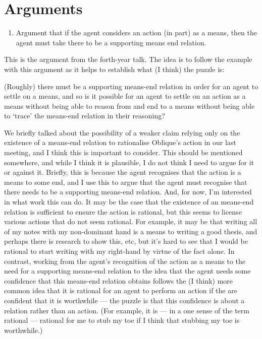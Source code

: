 \documentclass[10pt]{article}
\begin{document}
\section{Arguments}
\label{sec:arguments-1}

\begin{enumerate}
\item Argument that if the agent considers an action (in part) as a means, then the agent must take there to be a supporting means end relation.
\end{enumerate}

\begin{note}
  This is the argument from the forth-year talk.
  The idea is to follow the example with this argument as it helps to establish what (I think) the puzzle is:

  (Roughly) there must be a supporting means-end relation in order for an agent to settle on a means, and so is it possible for an agent to settle on an action as a means without being able to reason from and end to a means without being able to `trace' the means-end relation in their reasoning?

  We briefly talked about the possibility of a weaker claim relying only on the existence of a means-end relation to rationalise Oblique's action in our last meeting, and I think this is important to consider.
  This should be mentioned somewhere, and while I think it is plausible, I do not think I need to argue for it or against it.
  Briefly, this is because the agent recognises that the action is a means to some end, and I use this to argue that the agent must recognise that there needs to be a supporting means-end relation.
  And, for now, I'm interested in what work this can do.
  It may be the case that the existence of an means-end relation is sufficient to ensure the action is rational, but this seems to license various actions that do not seem rational.
  For example, it may be that writing all of my notes with my non-dominant hand is a means to writing a good thesis, and perhaps there is research to show this, etc, but it's hard to see that I would be rational to start writing with my right-hand by virtue of the fact alone.
  In contrast, working from the agent's recognition of the action as a means to the need for a supporting means-end relation to the idea that the agent needs some confidence that this means-end relation obtains follows the (I think) more common idea that it is rational for an agent to perform an action if the are confident that it is worthwhile --- the puzzle is that this confidence is about a relation rather than an action.
  (For example, it is --- in a one sense of the term rational --- rational for me to stub my toe if I think that stubbing my toe is worthwhile.)
\end{note}
\end{document}
